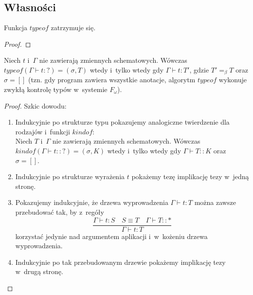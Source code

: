 \documentclass[11pt,leqno]{article}
\begin{document}
\subsection{Własności}

\begin{twierdzenie}
Funkcja $typeof$ zatrzymuje się.
\end{twierdzenie}
\begin{proof}
\end{proof}

\begin{twierdzenie}
Niech $t$ i~$\Gamma$ nie zawierają zmiennych schematowych. Wówczas \mbox{$typeof(\Gamma \vdash t : ?) = (\sigma, T)$} wtedy 
i~tylko wtedy gdy $\Gamma \vdash t : T'$, gdzie $T' =_\beta T$ oraz $\sigma = []$ (tzn. gdy program zawiera wszystkie anotacje, algorytm $typeof$ wykonuje zwykłą 
kontrolę typów w~systemie $F_\omega$).
\label{twtypecheck}
\end{twierdzenie}
\begin{proof}
Szkic dowodu:
\begin{enumerate}
\item Indukcyjnie po strukturze typu pokazujemy analogiczne twierdzenie dla rodzajów i~funkcji $kindof$:\\
Niech $T$ i~$\Gamma$ nie zawierają zmiennych schematowych. Wówczas \mbox{$kindof(\Gamma \vdash t :: ?) = (\sigma, K)$} wtedy
i~tylko wtedy gdy $\Gamma \vdash T :: K$ oraz $\sigma = []$.
\item Indukcyjnie po strukturze wyrażenia $t$ pokażemy tezę implikację tezy w~jedną stronę.
\item Pokazujemy indukcyjnie, że drzewa wyprowadzenia $\Gamma \vdash t : T$ można zawsze przebudować tak, by
z~regóły
\[
\frac{\Gamma \vdash t : S \quad S \equiv T \quad \Gamma \vdash T :: *}{\Gamma \vdash t : T}
\]
korzystać jedynie nad argumentem aplikacji i~w~kożeniu drzewa wyprowadzenia.
\item Indukcyjnie po tak przebudowanym drzewie pokażemy implikację tezy w~drugą stronę.
\end{enumerate}
\end{proof}
\end{document}
